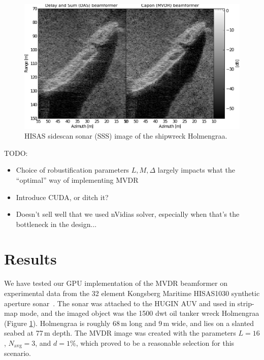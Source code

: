 \documentclass[10pt,a4paper]{article}
\newcommand\1{\vec 1}
\begin{document}
\begin{figure}[!t]
\centering
\includegraphics[width=\linewidth]{gfx/img_holmengraa.pdf}
\caption{HISAS sidescan sonar (SSS) image of the shipwreck Holmengraa.}\label{holmengraa}
\end{figure}

TODO:
\begin{itemize}
\item Choice of robustification parameters $L,M,\Delta$ largely impacts what the ``optimal'' way of implementing \gls{MVDR} 
\item Introduce CUDA, or ditch it?
\item Doesn't sell well that we used nVidias solver, especially when that's the bottleneck in the design...
\end{itemize}


\newpage
\section{Results}

We have tested our \gls{GPU} implementation of the \gls{MVDR} beamformer on experimental data from the 32 element Kongsberg Maritime HISAS1030 synthetic aperture sonar~\cite{Hansen2009}. The sonar was attached to the HUGIN \gls{AUV} and used in strip-map mode, and the imaged object was the 1500 dwt oil tanker wreck Holmengraa (Figure \ref{holmengraa}). Holmengraa is roughly 68\,m long and 9\,m wide, and lies on a slanted seabed at 77\,m depth. The \gls{MVDR} image was created with the parameters $L=16$, $N_\text{avg}=3$, and $d=1\%$, which proved to be a reasonable selection for this scenario.
\end{document}
